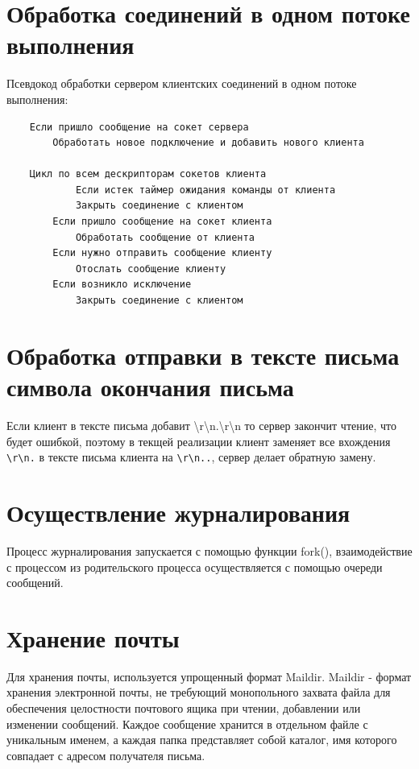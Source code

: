 \documentclass[a4paper,12pt]{report}
\begin{document}
\newpage


\section{Обработка соединений в одном потоке выполнения}

Псевдокод обработки сервером клиентских соединений в одном потоке выполнения:

\begin{verbatim}
    Если пришло сообщение на сокет сервера 
        Обработать новое подключение и добавить нового клиента
    
    Цикл по всем дескрипторам сокетов клиента
    	    Если истек таймер ожидания команды от клиента
            Закрыть соединение с клиентом
        Если пришло сообщение на сокет клиента
            Обработать сообщение от клиента
        Если нужно отправить сообщение клиенту
            Отослать сообщение клиенту
        Если возникло исключение
            Закрыть соединение с клиентом

\end{verbatim}

\section{Обработка отправки в тексте письма символа окончания письма}
Если клиент в тексте письма добавит \textbackslash{}r\textbackslash{}n.\textbackslash{}r\textbackslash{}n то сервер закончит чтение, что будет ошибкой, поэтому в текщей реализации клиент заменяет все вхождения \texttt{\textbackslash{}r\textbackslash{}n.} в тексте письма клиента на \texttt{\textbackslash{}r\textbackslash{}n..}, сервер делает обратную замену.

\section{Осуществление журналирования}

Процесс журналирования запускается с помощью функции fork(), взаимодействие с процессом из родительского процесса осуществляется с помощью очереди сообщений.

\section{Хранение почты}

Для хранения почты, используется упрощенный формат Maildir. Maildir - формат хранения электронной почты, не требующий монопольного захвата файла для обеспечения целостности почтового ящика при чтении, добавлении или изменении сообщений. Каждое сообщение хранится в отдельном файле с уникальным именем, а каждая папка представляет собой каталог, имя которого совпадает с адресом получателя письма. 
\end{document}
